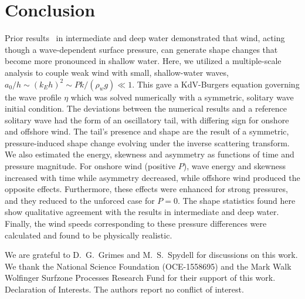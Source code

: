 \documentclass{jfm}
\begin{document}
\section{Conclusion}
Prior results~\citep{zdyrski2020wind} in intermediate and deep water
demonstrated that wind, acting though a wave-dependent surface
pressure, can generate shape changes that become more pronounced in
shallow water.
Here, we utilized a multiple-scale analysis to couple weak wind with
small, shallow-water waves, \ie{} $a_0/h \sim (k_E h)^2 \sim P k/(\rho_w
g) \ll 1$.
This gave a KdV-Burgers equation governing the wave profile $\eta$
which was solved numerically with a symmetric, solitary wave initial
condition.
The deviations between the numerical results and a reference solitary
wave had the form of an oscillatory tail, with differing sign for
onshore and offshore wind.
The tail's presence and shape are the result of a symmetric,
pressure-induced shape change evolving under the inverse scattering
transform.
We also estimated the energy, skewness and
asymmetry as functions of time and pressure magnitude.
For onshore wind (positive $P$), wave energy and skewness increased with
time while asymmetry decreased, while offshore wind produced the
opposite effects.
Furthermore, these effects were enhanced for strong pressures, and they
reduced to the unforced case for $P=0$.
The shape statistics found here show qualitative agreement with the
results in intermediate and deep water.
Finally, the wind speeds corresponding to these pressure differences
were calculated and found to be physically realistic.

\begin{acknowledgements}
We are grateful to D.~G.~Grimes and M.~S.~Spydell for discussions on
this work.
We thank the National Science Foundation (OCE-1558695) and the Mark Walk
Wolfinger Surfzone Processes Research Fund for their support of this
work.
Declaration of Interests. The authors report no conflict of interest.
\end{acknowledgements}

\appendix



\end{document}
